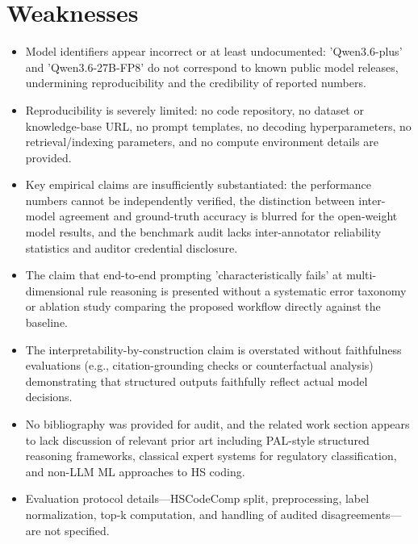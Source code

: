 \documentclass[11pt]{article}
\begin{document}
\section*{Weaknesses}
\begin{itemize}[leftmargin=*]
  \item Model identifiers appear incorrect or at least undocumented: 'Qwen3.6-plus' and 'Qwen3.6-27B-FP8' do not correspond to known public model releases, undermining reproducibility and the credibility of reported numbers.
  \item Reproducibility is severely limited: no code repository, no dataset or knowledge-base URL, no prompt templates, no decoding hyperparameters, no retrieval/indexing parameters, and no compute environment details are provided.
  \item Key empirical claims are insufficiently substantiated: the performance numbers cannot be independently verified, the distinction between inter-model agreement and ground-truth accuracy is blurred for the open-weight model results, and the benchmark audit lacks inter-annotator reliability statistics and auditor credential disclosure.
  \item The claim that end-to-end prompting 'characteristically fails' at multi-dimensional rule reasoning is presented without a systematic error taxonomy or ablation study comparing the proposed workflow directly against the baseline.
  \item The interpretability-by-construction claim is overstated without faithfulness evaluations (e.g., citation-grounding checks or counterfactual analysis) demonstrating that structured outputs faithfully reflect actual model decisions.
  \item No bibliography was provided for audit, and the related work section appears to lack discussion of relevant prior art including PAL-style structured reasoning frameworks, classical expert systems for regulatory classification, and non-LLM ML approaches to HS coding.
  \item Evaluation protocol details—HSCodeComp split, preprocessing, label normalization, top-k computation, and handling of audited disagreements—are not specified.
\end{itemize}
\end{document}
